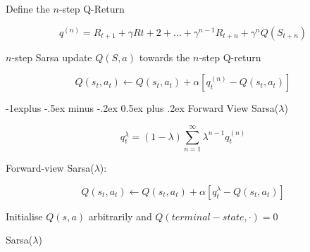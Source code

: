 \documentclass[10pt,landscape]{article}
\makeatletter
\renewcommand{\subsection}{\@startsection{subsection}{2}{0mm}%
                                {-1explus -.5ex minus -.2ex}%
                                {0.5ex plus .2ex}%
                                {\normalfont\normalsize\bfseries}}
\makeatother
\begin{document}
\begin{multicols}{3}
Define the $n$-step Q-Return

\begin{equation*}
    q^{(n)} = R_{t+1} + \gamma R{t+2} + \ldots + \gamma^{n-1} R_{t+n} + \gamma^n Q(S_{t+n})
\end{equation*}

$n$-step Sarsa update $Q(S, a)$ towards the $n$-step Q-return

\begin{equation*}
    Q(s_t, a_t) \leftarrow Q(s_t, a_t) + \alpha \left[q_t^{(n)} - Q(s_t, a_t) \right]
\end{equation*}

\subsection{Forward View Sarsa($\lambda$)}

\begin{equation*}
    q_t^\lambda = (1-\lambda) \sum_{n=1}^\infty \lambda^{n-1} q_t^{(n)}
\end{equation*}

Forward-view Sarsa($\lambda$):

\begin{equation*}
    Q(s_t, a_t) \leftarrow Q(s_t, a_t) + \alpha \left[q_t^\lambda - Q(s_t, a_t) \right]
\end{equation*}

\begin{algorithm}[H]
 Initialise $Q(s,a)$ arbitrarily and $Q(terminal-state, ·) = 0$\\
    \caption{Sarsa($\lambda$)}
\end{algorithm}


\end{multicols}
\end{document}
